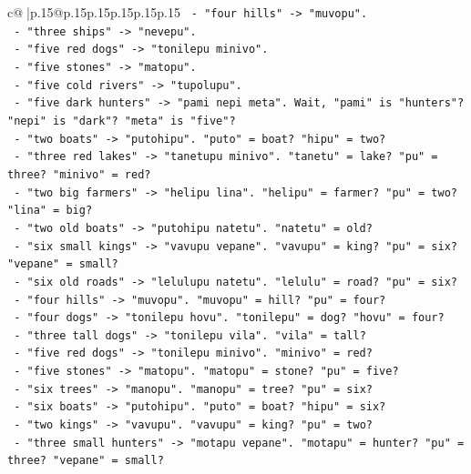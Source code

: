 \documentclass{article}
\begin{document}
{\begin{supertabular}{c@{$\;$}|p{.15\linewidth}@{}p{.15\linewidth}p{.15\linewidth}p{.15\linewidth}p{.15\linewidth}p{.15\linewidth}}
{{{\texttt{        {-} "four hills" {-}> "muvopu".} \\
\texttt{        {-} "three ships" {-}> "nevepu".} \\
\texttt{        {-} "five red dogs" {-}> "tonilepu minivo".} \\
\texttt{        {-} "five stones" {-}> "matopu".} \\
\texttt{        {-} "five cold rivers" {-}> "tupolupu".} \\
\texttt{        {-} "five dark hunters" {-}> "pami nepi meta". Wait, "pami" is "hunters"? "nepi" is "dark"? "meta" is "five"?} \\
\texttt{        {-} "two boats" {-}> "putohipu". "puto" = boat? "hipu" = two?} \\
\texttt{        {-} "three red lakes" {-}> "tanetupu minivo". "tanetu" = lake? "pu" = three? "minivo" = red?} \\
\texttt{        {-} "two big farmers" {-}> "helipu lina". "helipu" = farmer? "pu" = two? "lina" = big?} \\
\texttt{        {-} "two old boats" {-}> "putohipu natetu". "natetu" = old?} \\
\texttt{        {-} "six small kings" {-}> "vavupu vepane". "vavupu" = king? "pu" = six? "vepane" = small?} \\
\texttt{        {-} "six old roads" {-}> "lelulupu natetu". "lelulu" = road? "pu" = six?} \\
\texttt{        {-} "four hills" {-}> "muvopu". "muvopu" = hill? "pu" = four?} \\
\texttt{        {-} "four dogs" {-}> "tonilepu hovu". "tonilepu" = dog? "hovu" = four?} \\
\texttt{        {-} "three tall dogs" {-}> "tonilepu vila". "vila" = tall?} \\
\texttt{        {-} "five red dogs" {-}> "tonilepu minivo". "minivo" = red?} \\
\texttt{        {-} "five stones" {-}> "matopu". "matopu" = stone? "pu" = five?} \\
\texttt{        {-} "six trees" {-}> "manopu". "manopu" = tree? "pu" = six?} \\
\texttt{        {-} "six boats" {-}> "putohipu". "puto" = boat? "hipu" = six?} \\
\texttt{        {-} "two kings" {-}> "vavupu". "vavupu" = king? "pu" = two?} \\
\texttt{        {-} "three small hunters" {-}> "motapu vepane". "motapu" = hunter? "pu" = three? "vepane" = small?} \\
}}}
\end{supertabular}}
\end{document}
